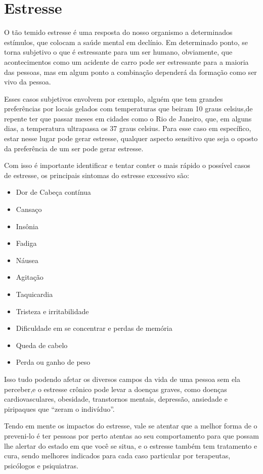 \documentclass[12pt]{article}
\begin{document}
\section{Estresse}

O tão temido estresse é uma resposta do nosso organismo a determinados estímulos, que colocam a saúde mental em declínio. Em determinado ponto, se torna subjetivo o que é estressante para um ser humano, obviamente, que acontecimentos como um acidente de carro pode ser estressante para a maioria das pessoas, mas em algum ponto a combinação dependerá da formação como ser vivo da pessoa.

Esses casos subjetivos envolvem por exemplo, alguém que tem grandes preferências por locais gelados com temperaturas que beiram 10 graus celsius,de repente ter que passar meses em cidades como o Rio de Janeiro, que, em alguns dias, a temperatura ultrapassa os 37 graus celsius. Para esse caso em específico, estar nesse lugar pode gerar estresse, qualquer aspecto sensitivo que seja o oposto da preferência de um ser pode gerar estresse.

Com isso é importante identificar e tentar conter o mais rápido o possível casos de estresse, os principais sintomas do estresse excessivo são:
\begin{itemize}
	\item Dor de Cabeça contínua
	\item Cansaço
	\item Insônia
	\item Fadiga
	\item Náusea
	\item Agitação
	\item Taquicardia
	\item Tristeza e irritabilidade
	\item Dificuldade em se concentrar e perdas de memória
	\item Queda de cabelo
	\item Perda ou ganho de peso
\end{itemize}

Isso tudo podendo afetar os diversos campos da vida de uma pessoa sem ela perceber,e o estresse crônico pode levar a doenças graves, como doenças cardiovasculares, obesidade, transtornos mentais, depressão, ansiedade e piripaques que “zeram o indivíduo”.

Tendo em mente os impactos do estresse, vale se atentar que a melhor forma de o preveni-lo é ter pessoas por perto atentas ao seu comportamento para que possam lhe alertar do estado em que você se situa, e o estresse também tem tratamento e cura, sendo melhores indicados para cada caso particular por terapeutas, psicólogos e psiquiatras.
\end{document}
